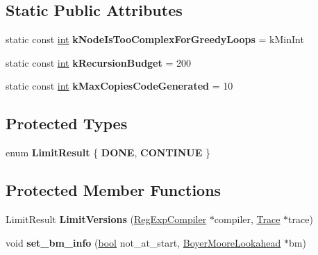 \subsection*{Static Public Attributes}
\begin{DoxyCompactItemize}
\item 
\mbox{\label{classv8_1_1internal_1_1RegExpNode_acdf311f0dacb16f281babbdd2ed30a70}} 
static const \mbox{\hyperlink{classint}{int}} {\bfseries k\+Node\+Is\+Too\+Complex\+For\+Greedy\+Loops} = k\+Min\+Int
\item 
\mbox{\label{classv8_1_1internal_1_1RegExpNode_ac77fc160c5ff5db7808583c401c65ede}} 
static const \mbox{\hyperlink{classint}{int}} {\bfseries k\+Recursion\+Budget} = 200
\item 
\mbox{\label{classv8_1_1internal_1_1RegExpNode_aee16545e1cda3652a44891cefb9e60ad}} 
static const \mbox{\hyperlink{classint}{int}} {\bfseries k\+Max\+Copies\+Code\+Generated} = 10
\end{DoxyCompactItemize}
\subsection*{Protected Types}
\begin{DoxyCompactItemize}
\item 
\mbox{\label{classv8_1_1internal_1_1RegExpNode_a500fa4ebb18d4f45d6ea99e6da33defc}} 
enum {\bfseries Limit\+Result} \{ {\bfseries D\+O\+NE}, 
{\bfseries C\+O\+N\+T\+I\+N\+UE}
 \}
\end{DoxyCompactItemize}
\subsection*{Protected Member Functions}
\begin{DoxyCompactItemize}
\item 
\mbox{\label{classv8_1_1internal_1_1RegExpNode_a5b390ba923933075f890a385a6b1b5ee}} 
Limit\+Result {\bfseries Limit\+Versions} (\mbox{\hyperlink{classv8_1_1internal_1_1RegExpCompiler}{Reg\+Exp\+Compiler}} $\ast$compiler, \mbox{\hyperlink{classv8_1_1internal_1_1Trace}{Trace}} $\ast$trace)
\item 
\mbox{\label{classv8_1_1internal_1_1RegExpNode_a1d97a915147648cff2a1792e2651547c}} 
void {\bfseries set\+\_\+bm\+\_\+info} (\mbox{\hyperlink{classbool}{bool}} not\+\_\+at\+\_\+start, \mbox{\hyperlink{classv8_1_1internal_1_1BoyerMooreLookahead}{Boyer\+Moore\+Lookahead}} $\ast$bm)
\end{DoxyCompactItemize}
